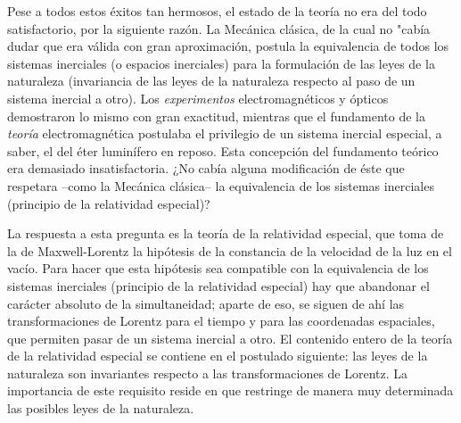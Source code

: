\documentclass[spanish]{book}
\begin{document}
Pese a todos estos éxitos tan hermosos, el estado de la teoría no era del todo
satisfactorio, por la siguiente razón. La Mecánica clásica, de la cual no "cabía dudar
que era válida con gran aproximación, postula la equivalencia de todos los sistemas
inerciales (o espacios inerciales) para la formulación de las leyes de la naturaleza
(invariancia de las leyes de la naturaleza respecto al paso de un sistema inercial a otro).
Los \textit{experimentos} electromagnéticos y ópticos demostraron lo mismo con gran
exactitud, mientras que el fundamento de la \textit{teoría} electromagnética postulaba el
privilegio de un sistema inercial especial, a saber, el del éter luminífero en reposo.
Esta concepción del fundamento teórico era demasiado insatisfactoria. ¿No cabía
alguna modificación de éste que respetara --como la Mecánica clásica-- la
equivalencia de los sistemas inerciales (principio de la relatividad especial)?

La respuesta a esta pregunta es la teoría de la relatividad especial, que toma de la de
Maxwell-Lorentz la hipótesis de la constancia de la velocidad de la luz en el vacío. Para
hacer que esta hipótesis sea compatible con la equivalencia de los sistemas inerciales
(principio de la relatividad especial) hay que abandonar el carácter absoluto de la
simultaneidad; aparte de eso, se siguen de ahí las transformaciones de Lorentz para el
tiempo y para las coordenadas espaciales, que permiten pasar de un sistema inercial a
otro. El contenido entero de la teoría de la relatividad especial se contiene en el
postulado siguiente: las leyes de la naturaleza son invariantes respecto a las
transformaciones de Lorentz. La importancia de este requisito reside en que restringe
de manera muy determinada las posibles leyes de la naturaleza.
\end{document}
